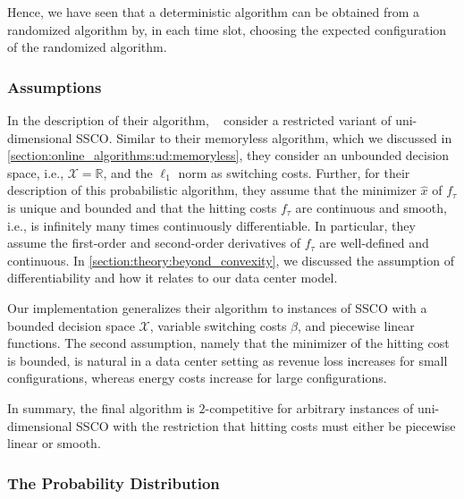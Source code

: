 Hence, we have seen that a deterministic algorithm can be obtained from a randomized algorithm by, in each time slot, choosing the expected configuration of the randomized algorithm.

\subsubsection{Assumptions}

In the description of their algorithm, \citeauthor*{Bansal2015}~\cite{Bansal2015} consider a restricted variant of uni-dimensional SSCO. Similar to their memoryless algorithm, which we discussed in \cref{section:online_algorithms:ud:memoryless}, they consider an unbounded decision space, i.e., $\mathcal{X} = \mathbb{R}$, and the $\ell_1$ norm as switching costs. Further, for their description of this probabilistic algorithm, they assume that the minimizer $\hat{x}$ of $f_{\tau}$ is unique and bounded and that the hitting costs $f_{\tau}$ are continuous and smooth, i.e., is infinitely many times continuously differentiable. In particular, they assume the first-order and second-order derivatives of $f_{\tau}$ are well-defined and continuous. In \cref{section:theory:beyond_convexity}, we discussed the assumption of differentiability and how it relates to our data center model.

Our implementation generalizes their algorithm to instances of SSCO with a bounded decision space $\mathcal{X}$, variable switching costs $\beta$, and piecewise linear functions. The second assumption, namely that the minimizer of the hitting cost is bounded, is natural in a data center setting as revenue loss increases for small configurations, whereas energy costs increase for large configurations.

In summary, the final algorithm is $2$-competitive for arbitrary instances of uni-dimensional SSCO with the restriction that hitting costs must either be piecewise linear or smooth.

\subsubsection{The Probability Distribution}

